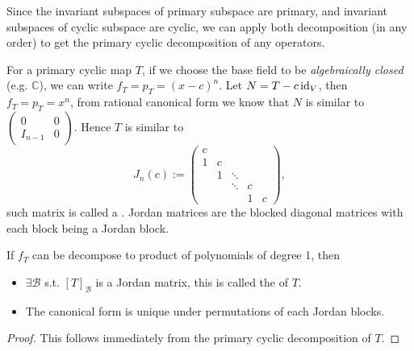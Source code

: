 Since the invariant subspaces of primary subspace are primary,
and invariant subspaces of cyclic subspace are cyclic,
we can apply both decomposition (in any order) to get the primary
cyclic decomposition of any operators.

For a primary cyclic map $T$, if we choose the base field to
be \textit{algebraically closed} (e.g. $\mathbb{C}$), we can write
$f_T = p_T = (x-c)^n$.
Let $N = T - c\operatorname{id}_V$, then $f_T = p_T = x^n$,
from rational canonical form we know that $N$ is similar to
$\begin{pmatrix}
	0 &0 \\ I_{n-1} &0
\end{pmatrix}$.
Hence $T$ is similar to
 \[
J_n(c) :=
\begin{pmatrix}
	c \\ 1 &c \\ &1 &\ddots \\ &&\ddots &c \\ &&&1 &c
\end{pmatrix},
\]
such matrix is called a .
Jordan matrices are the blocked diagonal matrices with
each block being a Jordan block.

\begin{theorem}
    If $f_T$ can be decompose to product of polynomials of degree 1, then
	\begin{itemize}
		 \item $\exists \mathcal{B}$ s.t. $[T]_{\mathcal{B}}$ is a Jordan matrix,
			 this is called the  of $T$.
		\item The canonical form is unique under permutations of each Jordan blocks.
	\end{itemize}
\end{theorem}
\begin{proof}[Proof]
    This follows immediately from the primary cyclic decomposition of $T$.
\end{proof}
